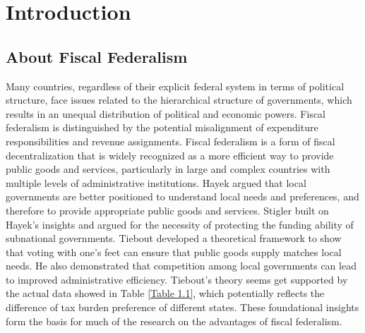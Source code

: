 
\chapter{Introduction} \label{chapter1:Introduction}

\section{About Fiscal Federalism}
Many countries, regardless of their explicit federal system in terms of political structure, face issues related to the hierarchical structure of governments, which results in an unequal distribution of political and economic powers. Fiscal federalism is distinguished by the potential misalignment of expenditure responsibilities and revenue assignments. Fiscal federalism is a form of fiscal decentralization that is widely recognized as a more efficient way to provide public goods and services, particularly in large and complex countries with multiple levels of administrative institutions. Hayek \cite{hayek2009use} argued that local governments are better positioned to understand local needs and preferences, and therefore to provide appropriate public goods and services. Stigler \cite{stigler1998tenable} built on Hayek's insights and argued for the necessity of protecting the funding ability of subnational governments. Tiebout \cite{tiebout1956pure} developed a theoretical framework to show that voting with one's feet can ensure that public goods supply matches local needs. He also demonstrated that competition among local governments can lead to improved administrative efficiency. Tiebout's theory seems get supported by the actual data showed in Table \ref*{Table 1.1}, which potentially reflects the difference of tax burden preference of different states. These foundational insights form the basis for much of the research on the advantages of fiscal federalism.
